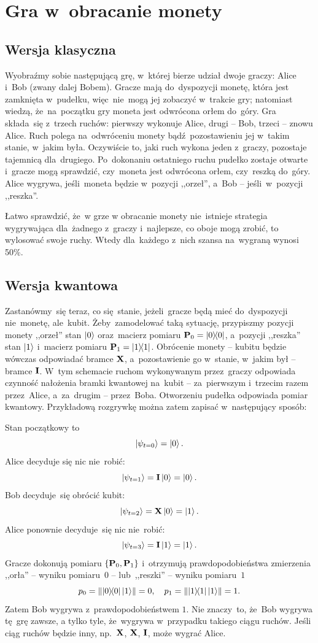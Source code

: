 
\section{Gra w~obracanie monety}
\subsection{Wersja klasyczna}
Wyobraźmy sobie następującą grę, w~której bierze udział dwoje graczy:
Alice i~Bob (zwany dalej Bobem). Gracze mają do~dyspozycji
monetę, która jest zamknięta w~pudełku, więc~nie~mogą jej zobaczyć
w~trakcie gry; natomiast wiedzą, że~na~początku gry moneta jest
odwrócona orłem do~góry. Gra składa~się z~trzech ruchów: pierwszy
wykonuje Alice, drugi -- Bob, trzeci -- znowu Alice. Ruch polega
na~odwróceniu monety bądź~pozostawieniu jej w~takim stanie, w~jakim
była. Oczywiście to, jaki ruch wykona jeden z~graczy, pozostaje
tajemnicą dla~drugiego. Po~dokonaniu ostatniego ruchu pudełko zostaje
otwarte i~gracze mogą sprawdzić, czy~moneta jest odwrócona orłem,
czy~reszką do~góry. Alice wygrywa, jeśli~moneta będzie w~pozycji
,,orzeł'', a~Bob -- jeśli~w~pozycji ,,reszka''.

Łatwo sprawdzić, że~w grze w obracanie monety nie~istnieje strategia
wygrywająca dla~żadnego z~graczy i~najlepsze, co oboje mogą zrobić, to
wylosować swoje ruchy. Wtedy dla~każdego z~nich szansa na~wygraną wynosi
50\%.

\subsection{Wersja kwantowa}
Zastanówmy~się teraz, co się~stanie, jeżeli~gracze będą mieć do~dyspozycji nie~monetę,
ale~kubit.
Żeby~zamodelować taką sytuację, przypiszmy pozycji monety ,,orzeł'' stan $\ket{0}$ oraz~macierz
pomiaru $\mathbf{P}_0=\ketbra{0}{0}$, a~pozycji ,,reszka''
stan $\ket{1}$ i~macierz pomiaru $\mathbf{P}_1=\ketbra{1}{1}$. Obrócenie monety --
kubitu będzie wówczas odpowiadać bramce $\mathbf{X}$, a~pozostawienie go w~stanie, w~jakim był
-- bramce $\mathbf{I}$. W~tym schemacie ruchom wykonywanym przez~graczy odpowiada czynność nałożenia bramki
kwantowej na~kubit -- za~pierwszym i~trzecim razem przez~Alice, a~za~drugim -- przez~Boba.
Otworzeniu pudełka odpowiada pomiar kwantowy.
Przykładową rozgrywkę można zatem zapisać w~następujący sposób:

Stan początkowy to
$$
	\ket{\psi_{t=0}}=\ket{0}.
$$
Alice decyduje się nic nie~robić:
$$
	\ket{\psi_{t=1}}=\mathbf{I}\ket{0}=\ket{0}.
$$
Bob decyduje~się obrócić kubit:
$$
	\ket{\psi_{t=2}}=\mathbf{X}\ket{0}=\ket{1}.
$$
Alice ponownie decyduje~się nic nie~robić:
$$
	\ket{\psi_{t=3}}=\mathbf{I}\ket{1}=\ket{1}.
$$
Gracze dokonują pomiaru $\{\mathbf{P}_0,\mathbf{P}_1\}$ i~otrzymują
prawdopodobieństwa zmierzenia ,,orła'' -- wyniku pomiaru~$0$ -- lub~,,reszki'' -- wyniku pomiaru~$1$
$$
	p_0=\norm{\ketbra{0}{0}\ket{1}}=0, \quad p_1=\norm{\ketbra{1}{1}\ket{1}}=1.
$$
Zatem Bob wygrywa z~prawdopodobieństwem $1$. Nie znaczy~to, że~Bob wygrywa
tę~grę zawsze, a tylko tyle, że~wygrywa w~przypadku takiego ciągu ruchów.
Jeśli ciąg ruchów będzie inny, np.~$\mathbf{X}$, $\mathbf{X}$, $\mathbf{I}$, może wygrać Alice.

